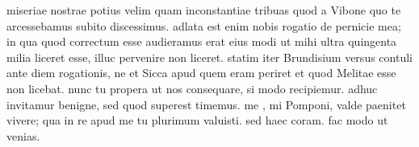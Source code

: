 


miseriae nostrae potius velim quam inconstantiae tribuas quod a
              Vibone quo te arcessebamus subito discessimus. adlata est enim
            nobis rogatio de pernicie mea; in qua quod correctum esse audieramus erat eius modi ut
            mihi ultra quingenta milia liceret esse, illuc pervenire non liceret. statim iter Brundisium versus contuli ante diem rogationis, ne et
              Sicca apud quem eram periret et quod Melitae esse non
            licebat. nunc tu propera ut nos consequare, si modo recipiemur. adhuc invitamur benigne, sed quod superest timemus. me , mi
              Pomponi, valde paenitet vivere; qua in re apud me tu plurimum valuisti. sed haec coram. fac modo ut venias.
